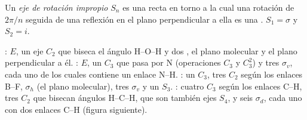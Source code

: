 \begin{definition}\label{def:b3:point-groups:improper}
Un \emph{eje de rotación impropio} $S_n$ es una
recta en torno a la cual una rotación de $2\pi/n$ seguida de una reflexión en el plano
perpendicular a ella es una . $S_1 = \sigma$ y $S_2 = i$.
\end{definition}

\begin{example}\label{ex:b3:point-groups:elements}
: $E$, un eje $C_2$ que biseca el ángulo H--O--H y dos , el plano molecular y el plano perpendicular a él. :
$E$, un $C_3$ que pasa por N (operaciones $C_3$ y $C_3^2$) y tres $\sigma_v$, cada uno de los cuales
contiene un enlace N--H. : un $C_3$, tres $C_2$ según los enlaces B--F,
$\sigma_h$ (el plano molecular), tres $\sigma_v$ y un $S_3$. : cuatro
$C_3$ según los enlaces C--H, tres $C_2$ que bisecan ángulos H--C--H, que son
también ejes $S_4$, y seis $\sigma_d$, cada uno con dos enlaces C--H
(figura siguiente).
\end{example}

